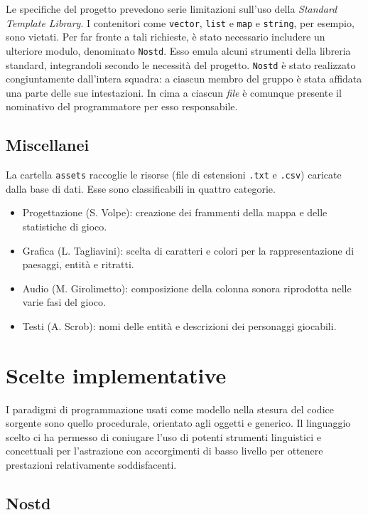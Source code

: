 \documentclass[a4paper]{article}
\begin{document}
Le specifiche del progetto prevedono serie limitazioni sull'uso della
\emph{Standard Template Library}. I contenitori come \verb!vector!, \verb!list!
e \verb!map! e \verb!string!, per esempio, sono vietati. Per far fronte a tali
richieste, \`e stato necessario includere un ulteriore modulo, denominato
\verb!Nostd!. Esso emula alcuni strumenti della libreria standard, integrandoli
secondo le necessit\`a del progetto. \verb!Nostd! \`e stato realizzato
congiuntamente dall'intera squadra: a ciascun membro del gruppo \`e stata
affidata una parte delle sue intestazioni. In cima a ciascun \emph{file} \`e
comunque presente il nominativo del programmatore per esso responsabile.

\subsection{Miscellanei}

La cartella \verb!assets! raccoglie le risorse (file di estensioni \verb!.txt! e
\verb!.csv!) caricate dalla base di dati.
Esse sono classificabili in quattro categorie.

\begin{itemize}
  \item Progettazione (S. Volpe): creazione dei frammenti della mappa e delle
    statistiche di gioco.
  \item Grafica (L. Tagliavini): scelta di caratteri e colori per la
    rappresentazione di paesaggi, entit\`a e ritratti.
  \item Audio (M. Girolimetto): composizione della colonna sonora riprodotta
    nelle varie fasi del gioco.
  \item Testi (A. Scrob): nomi delle entit\`a e descrizioni dei personaggi
    giocabili.
\end{itemize}

\section{Scelte implementative}

I paradigmi di programmazione usati come modello nella stesura del codice
sorgente sono quello procedurale, orientato agli oggetti e generico. Il
linguaggio scelto ci ha permesso di coniugare l'uso di potenti strumenti
linguistici e concettuali per l'astrazione con accorgimenti di basso livello
per ottenere prestazioni relativamente soddisfacenti.

\subsection{Nostd}
\end{document}
